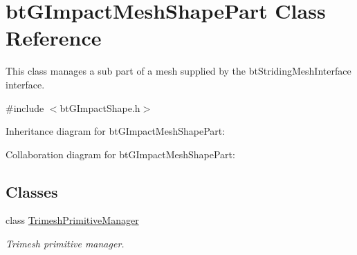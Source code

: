 \hypertarget{classbt_g_impact_mesh_shape_part}{\section{bt\+G\+Impact\+Mesh\+Shape\+Part Class Reference}
\label{classbt_g_impact_mesh_shape_part}
}


This class manages a sub part of a mesh supplied by the bt\+Striding\+Mesh\+Interface interface.  




{\ttfamily \#include $<$bt\+G\+Impact\+Shape.\+h$>$}



Inheritance diagram for bt\+G\+Impact\+Mesh\+Shape\+Part\+:


Collaboration diagram for bt\+G\+Impact\+Mesh\+Shape\+Part\+:
\subsection*{Classes}
\begin{DoxyCompactItemize}
\item 
class \hyperlink{classbt_g_impact_mesh_shape_part_1_1_trimesh_primitive_manager}{Trimesh\+Primitive\+Manager}
\begin{DoxyCompactList}\small\item\em Trimesh primitive manager. \end{DoxyCompactList}\end{DoxyCompactItemize}
